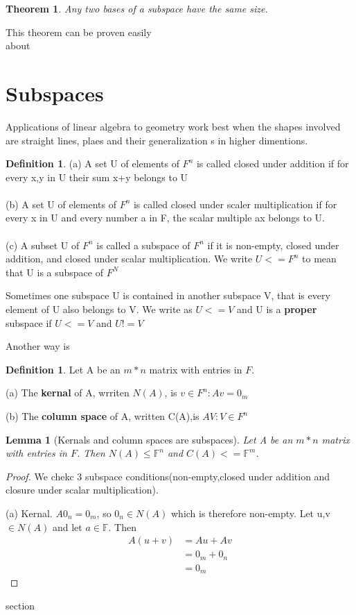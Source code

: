\documentclass[11pt,a4paper]{article}
\newtheorem{lemma}[theorem]{Lemma}
\newcommand{\manualnumber}{}
\newtheorem*{manualtheorem}{Theorem \manualnumber}
\theoremstyle{definition}
\newtheorem{definition}[theorem]{Definition}
\begin{document}
\renewcommand{\manualnumber}{2.17}
\begin{manualtheorem}
Any two bases of a subspace have the same size.
\end{manualtheorem}


\noindent This theorem can be proven easily
\\
about 


\section{Subspaces}
Applications of linear algebra to geometry work best when the shapes involved 
are straight lines, plaes and their generalization s in higher dimentions.

\begin{definition}
    (a) A set U of elements of $F^n$ is called closed under addition if for 
    every x,y in U their sum x+y belongs to U \\ \\
    (b) A set U of elements of $F^n$ is called closed under scaler multiplication if 
    for every x in U and every number a in F, the scalar multiple ax belongs to U.\\\\
    (c) A subset U of $F^n$ is called a subspace of $F^n$ if it is non-empty, closed under addition,
    and closed under scalar multiplication. We write $U<=F^n$ to mean that U is a subspace of $F^N$
\end{definition}

Sometimes one subspace U is contained in another subspace V, that is every element of U also belongs to V.
We write as $U<=V$ and U is a \textbf{proper} subspace if $U<=V$ and $U!=V$

Another way is 

\begin{definition}
  Let A be an $m*n$ matrix with entries in $F$.
  
  (a) The \textbf{kernal} of A, wrriten $N(A)$, is ${v\in F^n:Av=0_m}$

  (b) The \textbf{column space} of A, written C(A),is ${AV:V\in F^n}$
\end{definition}

\begin{lemma}[Kernals and column spaces are subspaces]
    Let A be an $m*n$ matrix with entries in $F$. Then $N(A)\leq \mathbb{F}^n$ and $C(A)<=\mathbb{F}^m$.

\end{lemma}

\begin{proof}
  We chekc 3 subspace conditions(non-empty,closed under addition and closure under scalar multiplication).

  (a) Kernal. $A0_n=0_m$, so $0_n \in N(A)$ which is therefore non-empty. Let u,v $\in N(A)$ and let $a\in \mathbb{F}$. Then
\begin{align*}
A(u+v) &= Au+Av\\
&=0_m+0_n\\
&=0_m 
\end{align*}


\end{proof}

section
\end{document}
